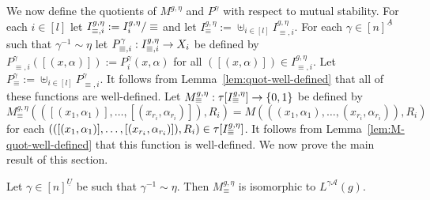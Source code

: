 \documentclass[../main/thesis.tex]{subfiles}
\begin{document}
We now define the quotients of $M^{g, \eta}$ and $P^{\gamma}$ with respect to
mutual stability. For each $i \in [l]$ let $I^{g, \eta}_{\equiv, i} :=
I^{g, \eta}_i / \equiv$ and let $I^{g, \eta}_{\equiv} := \uplus_{i \in
  [l]}I^{g, \eta}_{\equiv, i}$. For each $\gamma \in [n]^{\underline{A}}$ such
that $\gamma^{-1} \sim \eta$ let $P^{\gamma}_{\equiv, i}: I^{g, \eta}_{\equiv,
  i}\rightarrow X_i$ be defined by $P^{\gamma}_{\equiv, i} ([(x, \alpha)]) :=
P^{\gamma}_i (x, \alpha)$ for all $([(x, \alpha)]) \in I^{g, \eta}_{\equiv, i}$.
Let $P^{\gamma}_{\equiv} := \uplus_{i \in [l]}P^{\gamma}_{\equiv, i}$. It
follows from Lemma~\ref{lem:quot-well-defined} that all of these functions are
well-defined. Let $M^{g, \eta}_\equiv : \tau[I^{g, \eta}_\equiv] \rightarrow
\{0,1\}$ be defined by $M^{g, \eta}_{\equiv} (([(x_1, \alpha_1)], \ldots,
[(x_{r_i}, \alpha_{r_i})]), R_i) = M(((x_1, \alpha_1), \ldots, (x_{r_i},
\alpha_{r_i})), R_i)$ for each $(([(x_1, \alpha_1)], \ldots, [(x_{r_i},
\alpha_{r_i})]), R_i) \in \tau[I^{g, \eta}_\equiv]$. It follows from
Lemma~\ref{lem:M-quot-well-defined} that this function is well-defined. We now
prove the main result of this section.
\begin{prop}
	Let $\gamma \in [n]^{\underline{U}}$ be such that $\gamma^{-1} \sim \eta$.
  Then $M^{g, \eta}_{\equiv}$ is isomorphic to $L^{\gamma\mathcal{A}}(g)$.
	\label{prop:M-to-L-isomorphism}
\end{prop}
\end{document}
